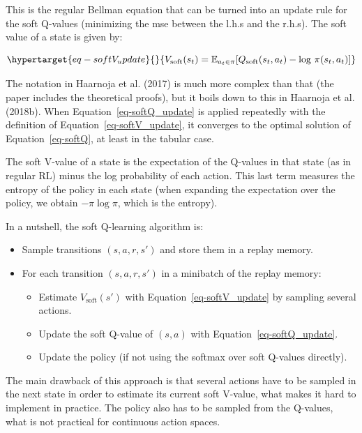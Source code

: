 \documentclass[
  letterpaper,
  DIV=11,
  numbers=noendperiod]{scrreprt}
\providecommand{\tightlist}{%
  \setlength{\itemsep}{0pt}\setlength{\parskip}{0pt}}\usepackage{longtable,booktabs,array}
\begin{document}
This is the regular Bellman equation that can be turned into an update
rule for the soft Q-values (minimizing the mse between the l.h.s and the
r.h.s). The soft value of a state is given by:

\begin{equation}\protect\hypertarget{eq-softV_update}{}{
    V_\text{soft}(s_t) = \mathbb{E}_{a_{t} \in \pi} [Q_\text{soft}(s_{t}, a_{t}) - \log \, \pi(s_t, a_t)]
}\label{eq-softV_update}\end{equation}

The notation in Haarnoja et al. (2017) is much more complex than that
(the paper includes the theoretical proofs), but it boils down to this
in Haarnoja et al. (2018b). When Equation~\ref{eq-softQ_update} is
applied repeatedly with the definition of
Equation~\ref{eq-softV_update}, it converges to the optimal solution of
Equation~\ref{eq-softQ}, at least in the tabular case.

The soft V-value of a state is the expectation of the Q-values in that
state (as in regular RL) minus the log probability of each action. This
last term measures the entropy of the policy in each state (when
expanding the expectation over the policy, we obtain \(- \pi \log \pi\),
which is the entropy).

In a nutshell, the soft Q-learning algorithm is:

\begin{itemize}
\tightlist
\item
  Sample transitions \((s, a, r, s')\) and store them in a replay
  memory.
\item
  For each transition \((s, a, r, s')\) in a minibatch of the replay
  memory:

  \begin{itemize}
  \tightlist
  \item
    Estimate \(V_\text{soft}(s')\) with Equation~\ref{eq-softV_update}
    by sampling several actions.
  \item
    Update the soft Q-value of \((s,a)\) with
    Equation~\ref{eq-softQ_update}.
  \item
    Update the policy (if not using the softmax over soft Q-values
    directly).
  \end{itemize}
\end{itemize}

The main drawback of this approach is that several actions have to be
sampled in the next state in order to estimate its current soft V-value,
what makes it hard to implement in practice. The policy also has to be
sampled from the Q-values, what is not practical for continuous action
spaces.
\end{document}
